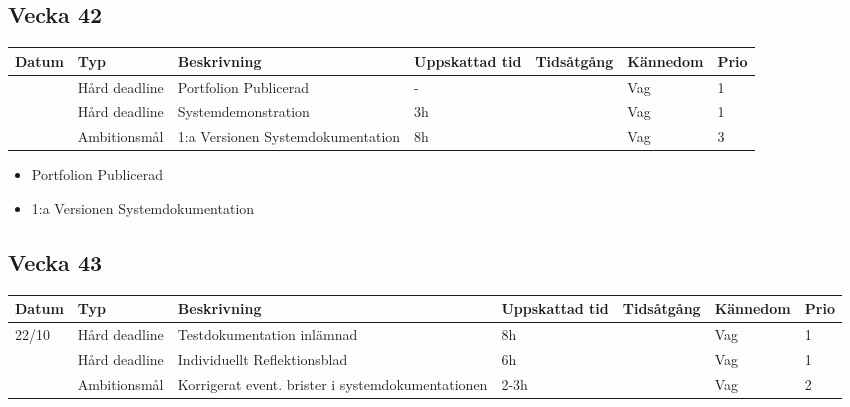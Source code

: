 \documentclass{TDP003mall}
\begin{document}
\subsection{Vecka 42}
\begin{tabularx}{\linewidth}{|l|l|X|l|l|l|l|}
	\hline
	Datum & Typ           & Beskrivning                       & Uppskattad tid & Tidsåtgång & Kännedom & Prio \\ [0.5ex]
	\hline                                             
          & Hård deadline & Portfolion Publicerad             & -              &            & Vag      & 1    \\
	\hline                                             
          & Hård deadline & Systemdemonstration               & 3h             &            & Vag      & 1    \\
	\hline                                             
          & Ambitionsmål  & 1:a Versionen Systemdokumentation & 8h             &            & Vag      & 3    \\
	\hline
\end{tabularx}

\begin{itemize}
	\item Portfolion Publicerad
	\item 1:a Versionen Systemdokumentation
\end{itemize}

\subsection{Vecka 43}
\begin{tabularx}{\linewidth}{|l|l|X|l|l|l|l|}
	\hline
	Datum & Typ           & Beskrivning                                       & Uppskattad tid & Tidsåtgång & Kännedom & Prio \\ [0.5ex]
	\hline                                                                             
	22/10 & Hård deadline & Testdokumentation inlämnad                        & 8h             &            & Vag      & 1    \\
	\hline                                                                             
          & Hård deadline & Individuellt Reflektionsblad                      & 6h             &            & Vag      & 1    \\
	\hline                                                                             
          & Ambitionsmål  & Korrigerat event. brister i systemdokumentationen & 2-3h           &            & Vag      & 2    \\
	\hline
\end{tabularx}
\end{document}
